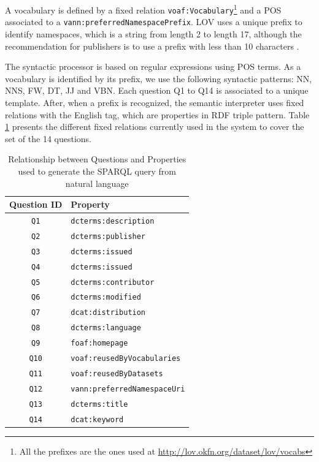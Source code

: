 \documentclass[runningheads,a4paper]{llncs}
\begin{document}
A vocabulary is defined by a fixed relation \texttt{voaf:Vocabulary}\footnote{All the prefixes are the ones used at \url{http://lov.okfn.org/dataset/lov/vocabs}} and a POS associated to a \texttt{vann:preferredNamespacePrefix}. LOV uses a unique prefix to identify namespaces, which is a string from length 2 to length 17, although the recommendation for publishers is to use a prefix with less than 10 characters \cite{pybernard12}.  

The syntactic processor is based on regular expressions using POS terms. As a vocabulary is identified by its prefix, we use  the following syntactic patterns: NN, NNS, FW, DT, JJ and VBN. Each question Q1 to Q14 is associated to a unique template. After, when a prefix is recognized, the semantic interpreter uses fixed relations with the English tag, which are properties in RDF triple pattern. Table \ref{tab:propTable} presents the different fixed relations currently used in the system to cover the set of the 14 questions.

\begin{table}
\centering
\caption{Relationship between Questions and Properties used to generate the SPARQL query from natural language}
\label{tab:propTable}
\begin{tabular}{|c|l|} \hline
\textbf{Question ID} & \textbf{Property} \\ \hline
\texttt{Q1} & \texttt{dcterms:description}  \\ \hline
\texttt{Q2} & \texttt{dcterms:publisher}  \\ \hline 
\texttt{Q3} & \texttt{dcterms:issued}  \\ \hline
\texttt{Q4} & \texttt{dcterms:issued}  \\ \hline
\texttt{Q5} & \texttt{dcterms:contributor}  \\ \hline
\texttt{Q6} & \texttt{dcterms:modified}  \\ \hline
\texttt{Q7} & \texttt{dcat:distribution}  \\ \hline
\texttt{Q8} & \texttt{dcterms:language}  \\ \hline
\texttt{Q9} & \texttt{foaf:homepage}  \\ \hline
\texttt{Q10} & \texttt{voaf:reusedByVocabularies} \\ \hline
\texttt{Q11} & \texttt{voaf:reusedByDatasets} \\ \hline
\texttt{Q12} & \texttt{vann:preferredNamespaceUri} \\ \hline
\texttt{Q13} & \texttt{dcterms:title} \\ \hline
\texttt{Q14} & \texttt{dcat:keyword} \\ \hline

\end{tabular}
\end{table}
\end{document}
